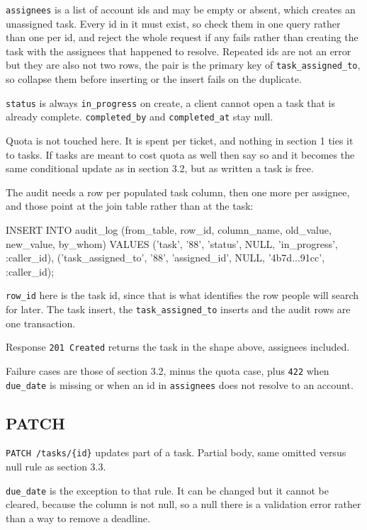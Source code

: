 \documentclass[12pt,letterpaper]{article}
\begin{document}
\texttt{assignees} is a list of account ids and may be empty or absent, which
creates an unassigned task. Every id in it must exist, so check them in one
query rather than one per id, and reject the whole request if any fails rather
than creating the task with the assignees that happened to resolve. Repeated ids
are not an error but they are also not two rows, the pair is the primary key of
\texttt{task\_assigned\_to}, so collapse them before inserting or the insert
fails on the duplicate.

\texttt{status} is always \texttt{in\_progress} on create, a client cannot open a
task that is already complete. \texttt{completed\_by} and \texttt{completed\_at}
stay null.

Quota is not touched here. It is spent per ticket, and nothing in section 1 ties
it to tasks. If tasks are meant to cost quota as well then say so and it becomes
the same conditional update as in section 3.2, but as written a task is free.

The audit needs a row per populated task column, then one more per assignee, and
those point at the join table rather than at the task:

\begin{code}
INSERT INTO audit_log
  (from_table, row_id, column_name,
   old_value, new_value, by_whom)
VALUES
  ('task', '88', 'status',
   NULL, 'in_progress', :caller_id),
  ('task_assigned_to', '88', 'assigned_id',
   NULL, '4b7d...91cc', :caller_id);
\end{code}

\texttt{row\_id} here is the task id, since that is what identifies the row
people will search for later. The task insert, the \texttt{task\_assigned\_to}
inserts and the audit rows are one transaction.

Response \texttt{201 Created} returns the task in the shape above, assignees
included.

Failure cases are those of section 3.2, minus the quota case, plus \texttt{422}
when \texttt{due\_date} is missing or when an id in \texttt{assignees} does not
resolve to an account.

\subsection{PATCH}

\texttt{PATCH /tasks/\{id\}} updates part of a task. Partial body, same omitted
versus null rule as section 3.3.

\texttt{due\_date} is the exception to that rule. It can be changed but it
cannot be cleared, because the column is not null, so a null there is a
validation error rather than a way to remove a deadline.
\end{document}
